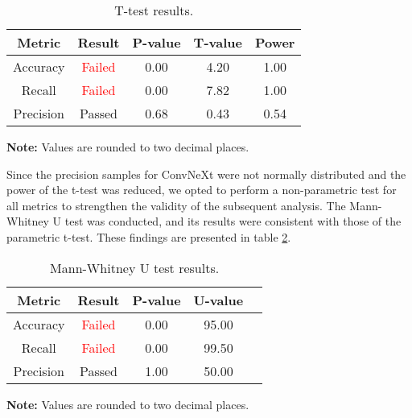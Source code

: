 \begin{table}[h]
    \centering
    \caption{T-test results.}
    \renewcommand{\arraystretch}{1.5}
    \begin{tabular}{|c|c|c|c|c|}
        \hline
        \textbf{Metric} & \textbf{Result} & \textbf{P-value} & \textbf{T-value} & \textbf{Power} \\ \hline
        Accuracy & \textcolor{red}{Failed} & 0.00 & 4.20 & 1.00 \\ \hline
        Recall & \textcolor{red}{Failed} & 0.00 & 7.82 & 1.00 \\ \hline
        Precision & Passed & 0.68 & 0.43 & 0.54 \\ \hline
    \end{tabular}
    \begin{center}
        \parbox{\columnwidth}{\centering \footnotesize \textbf{Note:} Values are rounded to two decimal places.}
    \end{center}
\label{tab:t_results}
\end{table}


Since the precision samples for ConvNeXt were not normally distributed and the power of the t-test was reduced, we opted to perform a non-parametric test for all metrics to strengthen the validity of the subsequent analysis. The Mann-Whitney U test was conducted, and its results were consistent with those of the parametric t-test. These findings are presented in table \ref{tab:mann_whitney_results}.

\begin{table}[h]
    \centering
    \caption{Mann-Whitney U test results.}
    \renewcommand{\arraystretch}{1.5}
    \begin{tabular}{|c|c|c|c|c|}
        \hline
        \textbf{Metric} & \textbf{Result} & \textbf{P-value} & \textbf{U-value} \\ \hline
        Accuracy & \textcolor{red}{Failed} & 0.00 & 95.00 \\ \hline
        Recall & \textcolor{red}{Failed} & 0.00 & 99.50 \\ \hline
        Precision & Passed & 1.00 & 50.00 \\ \hline
    \end{tabular}
    \begin{center}
        \parbox{\columnwidth}{\centering \footnotesize \textbf{Note:} Values are rounded to two decimal places.}
    \end{center}
\label{tab:mann_whitney_results}
\end{table}

